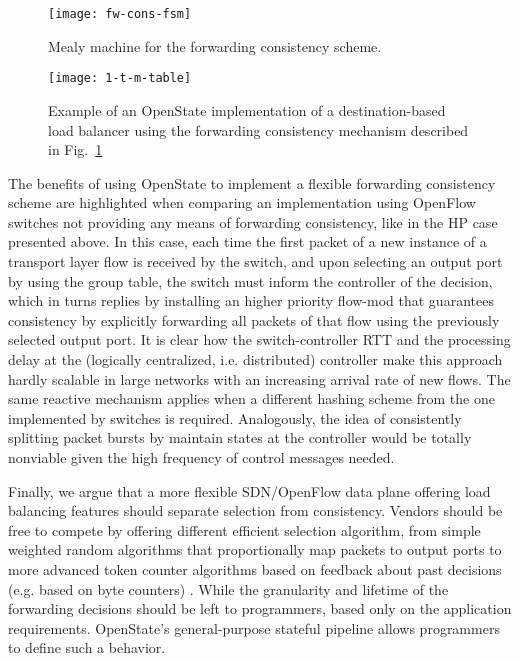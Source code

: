 \documentclass[10pt,conference]{IEEEtran}
\begin{document}
\begin{figure}
  \centering
  \texttt{[image: fw-cons-fsm]}
  \caption{Mealy machine for the forwarding consistency scheme.}
  \label{fig:fw-cons-fsm}
\end{figure}

\begin{figure}[b]
  \centering
  \texttt{[image: 1-t-m-table]}
  \caption{Example of an OpenState implementation of a destination-based load balancer using the forwarding consistency mechanism described in Fig.~\ref{fig:fw-cons-fsm}}
  \label{fig:1-t-m-table}
\end{figure}

The benefits of using OpenState to implement a flexible forwarding consistency scheme are highlighted when comparing an implementation using OpenFlow switches not providing any means of forwarding consistency, like in the HP case presented above. In this case, each time the first packet of a new instance of a transport layer flow is received by the switch, and upon selecting an output port by using the group table, the switch must inform the controller of the decision, which in turns replies by installing an higher priority flow-mod that guarantees consistency by explicitly forwarding all packets of that flow using the previously selected output port. It is clear how the switch-controller RTT and the processing delay at the (logically centralized, i.e. distributed) controller make this approach hardly scalable in large networks with an increasing arrival rate of new flows. The same reactive mechanism applies when a different hashing scheme from the one implemented by switches is required. Analogously, the idea of consistently splitting packet bursts by maintain states at the controller would be totally nonviable given the high frequency of control messages needed.

Finally, we argue that a more flexible SDN/OpenFlow data plane offering load balancing features should separate selection from consistency. Vendors should be free to compete by offering different efficient selection algorithm, from simple weighted random algorithms that proportionally map packets to output ports to more advanced token counter algorithms based on feedback about past decisions (e.g. based on byte counters) \cite{kandula07}. While the granularity and lifetime of the forwarding decisions should be left to programmers, based only on the application requirements. OpenState's general-purpose stateful pipeline allows programmers to define such a behavior.
\end{document}
